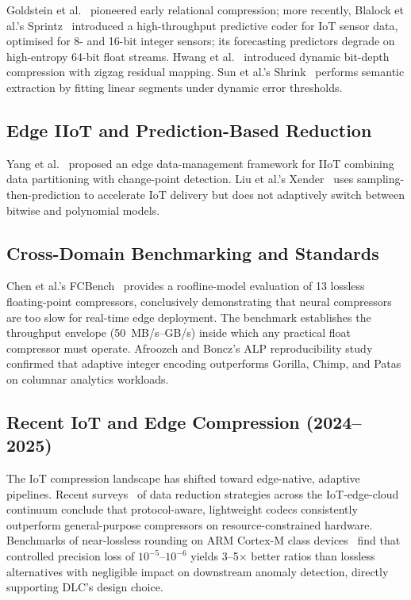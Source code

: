 \documentclass[runningheads]{llncs}
\begin{document}
Goldstein et al.~\cite{goldstein1998} pioneered early relational compression; more recently, Blalock et al.'s Sprintz~\cite{sprintz2018} introduced a high-throughput predictive coder for IoT sensor data, optimised for 8- and 16-bit integer sensors; its forecasting predictors degrade on high-entropy 64-bit float streams. Hwang et al.~\cite{hwang2023} introduced dynamic bit-depth compression with zigzag residual mapping. Sun et al.'s Shrink~\cite{shrink2024} performs semantic extraction by fitting linear segments under dynamic error thresholds.

\subsection{Edge IIoT and Prediction-Based Reduction}

Yang et al.~\cite{yang2023} proposed an edge data-management framework for IIoT combining data partitioning with change-point detection. Liu et al.'s Xender~\cite{liu2024} uses sampling-then-prediction to accelerate IoT delivery but does not adaptively switch between bitwise and polynomial models.

\subsection{Cross-Domain Benchmarking and Standards}

Chen et al.'s FCBench~\cite{fcbench2024} provides a roofline-model evaluation of 13 lossless floating-point compressors, conclusively demonstrating that neural compressors are too slow for real-time edge deployment. The benchmark establishes the throughput envelope (50~MB/s--GB/s) inside which any practical float compressor must operate. Afroozeh and Boncz's ALP reproducibility study~\cite{alp_repro2024} confirmed that adaptive integer encoding outperforms Gorilla, Chimp, and Patas on columnar analytics workloads.

\subsection{Recent IoT and Edge Compression (2024--2025)}

The IoT compression landscape has shifted toward edge-native, adaptive pipelines. Recent surveys~\cite{jia2024iot} of data reduction strategies across the IoT-edge-cloud continuum conclude that protocol-aware, lightweight codecs consistently outperform general-purpose compressors on resource-constrained hardware. Benchmarks of near-lossless rounding on ARM Cortex-M class devices~\cite{singh2024edge} find that controlled precision loss of $10^{-5}$--$10^{-6}$ yields 3--5$\times$ better ratios than lossless alternatives with negligible impact on downstream anomaly detection, directly supporting DLC's design choice.
\end{document}
